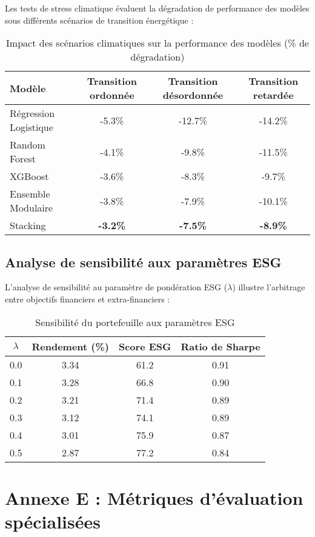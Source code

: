 Les tests de stress climatique évaluent la dégradation de performance des modèles sous différents scénarios de transition énergétique :

\begin{table}[h]
\centering
\caption{Impact des scénarios climatiques sur la performance des modèles (\% de dégradation)}
\begin{tabular}{lccc}
\toprule
\textbf{Modèle} & \textbf{Transition ordonnée} & \textbf{Transition désordonnée} & \textbf{Transition retardée} \\
\midrule
Régression Logistique & -5.3\% & -12.7\% & -14.2\% \\
Random Forest & -4.1\% & -9.8\% & -11.5\% \\
XGBoost & -3.6\% & -8.3\% & -9.7\% \\
Ensemble Modulaire & -3.8\% & -7.9\% & -10.1\% \\
Stacking & \textbf{-3.2\%} & \textbf{-7.5\%} & \textbf{-8.9\%} \\
\bottomrule
\end{tabular}
\end{table}

\subsection{Analyse de sensibilité aux paramètres ESG}

L'analyse de sensibilité au paramètre de pondération ESG ($\lambda$) illustre l'arbitrage entre objectifs financiers et extra-financiers :

\begin{table}[h]
\centering
\caption{Sensibilité du portefeuille aux paramètres ESG}
\begin{tabular}{cccc}
\toprule
\textbf{$\lambda$} & \textbf{Rendement (\%)} & \textbf{Score ESG} & \textbf{Ratio de Sharpe} \\
\midrule
0.0 & 3.34 & 61.2 & 0.91 \\
0.1 & 3.28 & 66.8 & 0.90 \\
0.2 & 3.21 & 71.4 & 0.89 \\
0.3 & 3.12 & 74.1 & 0.89 \\
0.4 & 3.01 & 75.9 & 0.87 \\
0.5 & 2.87 & 77.2 & 0.84 \\
\bottomrule
\end{tabular}
\end{table}

\section{Annexe E : Métriques d'évaluation spécialisées}

